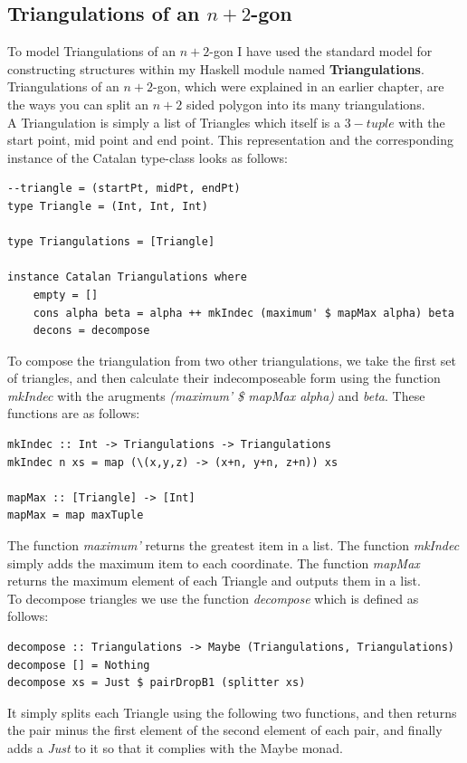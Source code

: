 \documentclass[12pt]{article}
\begin{document}
\subsection{Triangulations of an $n+2$-gon}
To model Triangulations of an $n+2$-gon I have used the standard model for constructing structures within my Haskell module named {\bf Triangulations}.\\
Triangulations of an $n+2$-gon, which were explained in an earlier chapter, are the ways you can split an $n+2$ sided polygon into its many triangulations.\\
A Triangulation is simply a list of Triangles which itself is a $3-tuple$ with the start point, mid point and end point. This representation and the corresponding instance of the Catalan type-class looks as follows:
\begin{lstlisting}
--triangle = (startPt, midPt, endPt)
type Triangle = (Int, Int, Int)

type Triangulations = [Triangle]

instance Catalan Triangulations where
	empty = []	
	cons alpha beta = alpha ++ mkIndec (maximum' $ mapMax alpha) beta
	decons = decompose
\end{lstlisting}
To compose the triangulation from two other triangulations, we take the first set of triangles, and then calculate their indecomposeable form using the function {\it mkIndec} with the arugments {\it (maximum' \$ mapMax alpha)} and {\it beta}. These functions are as follows:
\begin{lstlisting}
mkIndec :: Int -> Triangulations -> Triangulations
mkIndec n xs = map (\(x,y,z) -> (x+n, y+n, z+n)) xs

mapMax :: [Triangle] -> [Int]
mapMax = map maxTuple
\end{lstlisting}
The function {\it maximum'} returns the greatest item in a list. The function {\it mkIndec} simply adds the maximum item to each coordinate. The function {\it mapMax} returns the maximum element of each Triangle and outputs them in a list.\\
To decompose triangles we use the function {\it decompose} which is defined as follows:
\begin{lstlisting}
decompose :: Triangulations -> Maybe (Triangulations, Triangulations)
decompose [] = Nothing
decompose xs = Just $ pairDropB1 (splitter xs)
\end{lstlisting}
It simply splits each Triangle using the following two functions, and then returns the pair minus the first element of the second element of each pair, and finally adds a {\it Just} to it so that it complies with the Maybe monad.
\end{document}
